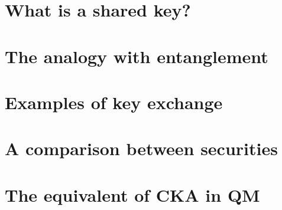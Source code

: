 \section{What is a shared key?}
\section{The analogy with entanglement}
\section{Examples of key exchange}
\section{A comparison between securities}
\section{The equivalent of CKA in QM}
